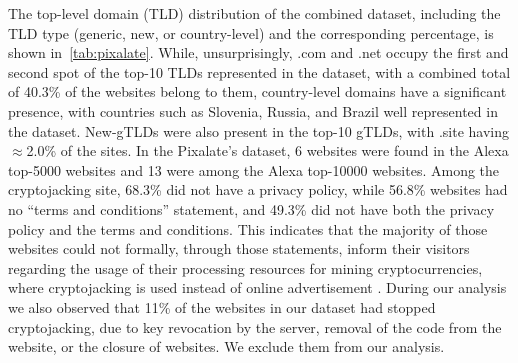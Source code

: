 \documentclass[acmlarge]{acmart}
\newcommand{\cj}{cryptojacking\xspace}
\begin{document}
The top-level domain (TLD) distribution of the combined dataset, including the TLD type (generic, new, or country-level) and the corresponding  percentage, is shown in~\autoref{tab:pixalate}. While, unsurprisingly, .com and .net occupy the first and second spot of the top-10 TLDs represented in the dataset, with a combined total of 40.3\% of the websites belong to them, country-level domains have a significant presence, with countries such as Slovenia, Russia, and Brazil well represented in the dataset. New-gTLDs were also present in the top-10 gTLDs, with .site having $\approx$2.0\% of the sites. In the Pixalate's dataset, 6 websites were found in the Alexa top-5000 websites and 13 were among the Alexa top-10000 websites. Among the \cj site, 68.3\% did not have a privacy policy, while 56.8\% websites had no ``terms and conditions'' statement, and  49.3\% did not have both the privacy policy and the terms and conditions. This indicates that the majority of those websites could not formally, through those statements, inform their visitors regarding the usage of their processing resources for mining cryptocurrencies, where \cj is used  instead of online advertisement \cite{CalzavaraRB18}. During our analysis we also observed that 11\% of the websites in our dataset had stopped \cj, due to key revocation by the server, removal of the code from the website, or the closure of websites. We exclude them from our analysis. 
 
\end{document}
